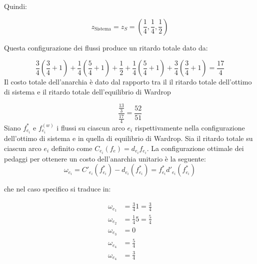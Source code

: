 \documentclass[11pt,largemargins]{homework}
\begin{document}
\begin{alphaparts}
  Quindi:

  \begin{equation*}
    z_{\text{Sistema}}=z_S=\left(\frac{1}{4},\frac{1}{4},\frac{1}{2}\right)
  \end{equation*}

  Questa configurazione dei flussi produce un ritardo totale dato da:

  \begin{equation*}
    \frac{3}{4}\left(\frac{3}{4}+1\right)+\frac{1}{4}\left(\frac{5}{4}+1\right)+\frac{1}{2}+\frac{1}{4}\left(\frac{5}{4}+1\right)+\frac{3}{4}\left(\frac{3}{4}+1\right)= \frac{17}{4}
  \end{equation*}
  \questionpart
  Il costo totale dell'anarchia è dato dal rapporto tra il il ritardo totale dell'ottimo di sistema e il ritardo totale dell'equilibrio di Wardrop

  \begin{equation*}
    \frac{\frac{13}{3}}{\frac{17}{4}}=\frac{52}{51}
  \end{equation*}
  \questionpart
  Siano \(f^*_{e_i}\) e \(f^{(w)}_{e_i}\) i flussi su ciascun arco \(e_i\) rispettivamente nella configurazione dell'ottimo di sistema e in quella di equilibrio di Wardrop. Sia il ritardo totale su ciascun arco \(e_i\) definito come \(C_{e_i}(f_e)=d_{e_i}f_{e_i}\). La configurazione ottimale dei pedaggi per ottenere un costo dell'anarchia unitario è la seguente:
  \begin{equation*}
    \omega_{e_i}=C'_{e_i}(f^*_{e_i})-d_{e_i}(f^*_{e_i})=f^*_{e_i}d'_{e_i}(f^*_{e_i})
  \end{equation*} 

  che nel caso specifico si traduce in:

  \begin{align*}
    \omega_{e_1}&=\frac{3}{4} 1=\frac{3}{4}\\
    \omega_{e_2}&=\frac{1}{4} 5=\frac{5}{4}\\
    \omega_{e_3}&=0\\
    \omega_{e_4}&=\frac{5}{4}\\
    \omega_{e_4}&=\frac{3}{4}\\
  \end{align*}

  \end{alphaparts}

  
\end{document}
